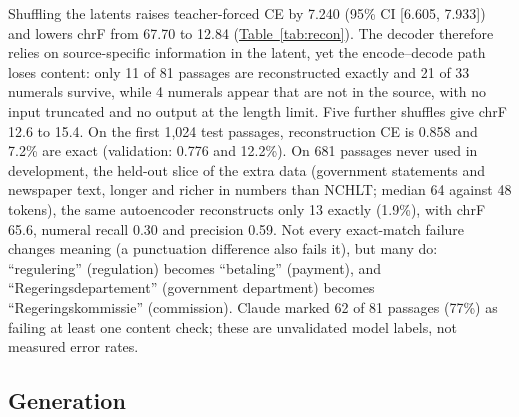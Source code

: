 \documentclass[11pt,a4paper]{article}
\begin{document}
Shuffling the latents raises teacher-forced CE by 7.240 (95\% CI [6.605, 7.933]) and lowers chrF from 67.70 to 12.84 (\hyperref[tab:recon]{Table~\ref*{tab:recon}}). The decoder therefore relies on source-specific information in the latent, yet the encode--decode path loses content: only 11 of 81 passages are reconstructed exactly and 21 of 33 numerals survive, while 4 numerals appear that are not in the source, with no input truncated and no output at the length limit. Five further shuffles give chrF 12.6 to 15.4. On the first 1,024 test passages, reconstruction CE is 0.858 and 7.2\% are exact (validation: 0.776 and 12.2\%). On 681 passages never used in development, the held-out slice of the extra data (government statements and newspaper text, longer and richer in numbers than NCHLT; median 64 against 48 tokens), the same autoencoder reconstructs only 13 exactly (1.9\%), with chrF 65.6, numeral recall 0.30 and precision 0.59. Not every exact-match failure changes meaning (a punctuation difference also fails it), but many do: ``regulering'' (regulation) becomes ``betaling'' (payment), and ``Regeringsdepartement'' (government department) becomes ``Regeringskommissie'' (commission). Claude marked 62 of 81 passages (77\%) as failing at least one content check; these are unvalidated model labels, not measured error rates.

\subsection{Generation}
\label{sec:res-gen}
\end{document}
